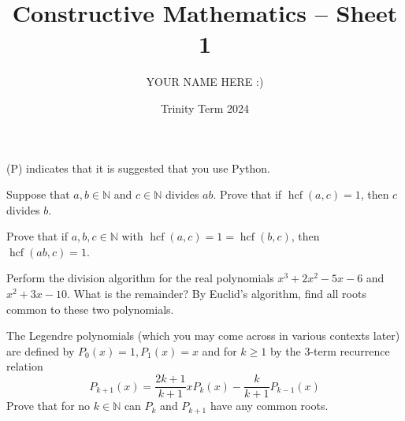 \documentclass[answers]{exam}
\title{Constructive Mathematics -- Sheet 1}
\author{YOUR NAME HERE :)}
\date{Trinity Term 2024}
\begin{document}
\maketitle
(P) indicates that it is suggested that you use Python.
\begin{questions}

\question%



\question%



\question%
Suppose that $a, b \in \mathbb{N}$ and $c \in \mathbb{N}$ divides $a b$. Prove that if $\operatorname{hcf}(a, c)=1$, then $c$ divides $b$.



\question%
Prove that if $a, b, c \in \mathbb{N}$ with $\operatorname{hcf}(a, c)=1=\operatorname{hcf}(b, c)$, then $\operatorname{hcf}(a b, c)=1$.



\question%
Perform the division algorithm for the real polynomials $x^{3}+2 x^{2}-5 x-6$ and $x^{2}+3 x-10$. What is the remainder? By Euclid's algorithm, find all roots common to these two polynomials.



\question%
The Legendre polynomials (which you may come across in various contexts later) are defined by $P_{0}(x)=1, P_{1}(x)=x$ and for $k \geq 1$ by the 3-term recurrence relation \[
	P_{k+1}(x)=\frac{2 k+1}{k+1} x P_{k}(x)-\frac{k}{k+1} P_{k-1}(x)
\] Prove that for no $k \in \mathbb{N}$ can $P_{k}$ and $P_{k+1}$ have any common roots.

\end{questions}
\end{document}
